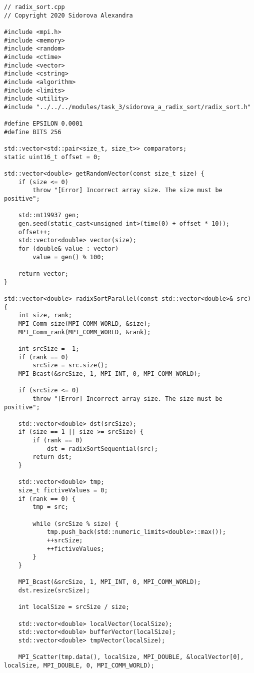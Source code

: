 \documentclass{report}
\begin{document}
\begin{lstlisting}
// radix_sort.cpp
// Copyright 2020 Sidorova Alexandra

#include <mpi.h>
#include <memory>
#include <random>
#include <ctime>
#include <vector>
#include <cstring>
#include <algorithm>
#include <limits>
#include <utility>
#include "../../../modules/task_3/sidorova_a_radix_sort/radix_sort.h"

#define EPSILON 0.0001
#define BITS 256

std::vector<std::pair<size_t, size_t>> comparators;
static uint16_t offset = 0;

std::vector<double> getRandomVector(const size_t size) {
    if (size <= 0)
        throw "[Error] Incorrect array size. The size must be positive";

    std::mt19937 gen;
    gen.seed(static_cast<unsigned int>(time(0) + offset * 10));
    offset++;
    std::vector<double> vector(size);
    for (double& value : vector)
        value = gen() % 100;

    return vector;
}

std::vector<double> radixSortParallel(const std::vector<double>& src) {
    int size, rank;
    MPI_Comm_size(MPI_COMM_WORLD, &size);
    MPI_Comm_rank(MPI_COMM_WORLD, &rank);

    int srcSize = -1;
    if (rank == 0)
        srcSize = src.size();
    MPI_Bcast(&srcSize, 1, MPI_INT, 0, MPI_COMM_WORLD);

    if (srcSize <= 0)
        throw "[Error] Incorrect array size. The size must be positive";

    std::vector<double> dst(srcSize);
    if (size == 1 || size >= srcSize) {
        if (rank == 0)
            dst = radixSortSequential(src);
        return dst;
    }

    std::vector<double> tmp;
    size_t fictiveValues = 0;
    if (rank == 0) {
        tmp = src;

        while (srcSize % size) {
            tmp.push_back(std::numeric_limits<double>::max());
            ++srcSize;
            ++fictiveValues;
        }
    }

    MPI_Bcast(&srcSize, 1, MPI_INT, 0, MPI_COMM_WORLD);
    dst.resize(srcSize);

    int localSize = srcSize / size;

    std::vector<double> localVector(localSize);
    std::vector<double> bufferVector(localSize);
    std::vector<double> tmpVector(localSize);

    MPI_Scatter(tmp.data(), localSize, MPI_DOUBLE, &localVector[0], localSize, MPI_DOUBLE, 0, MPI_COMM_WORLD);


\end{lstlisting}
\end{document}
